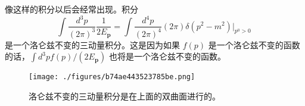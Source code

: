 像这样的积分以后会经常出现。积分
\begin{equation}
\int \frac{d^3p}{(2\pi)^3} \frac{1}{2 E_{\mathbf p}} = \int \frac{d^4 p}{(2\pi)^4} (2\pi) \delta(p^2 - m^2) \bigg|_{p^0>0}~
\end{equation}
是一个洛仑兹不变的三动量积分。这是因为如果 $f(p)$ 是一个洛仑兹不变的函数的话，$\int d^3 p f(p)/(2E_{\mathbf p})$ 也将是一个洛仑兹不变的函数。
\begin{figure}[ht]
\centering
\texttt{[image: ./figures/b74ae443523785be.png]}
\caption{洛仑兹不变的三动量积分是在上面的双曲面进行的。} \label{fig_spectr_1}
\end{figure}
